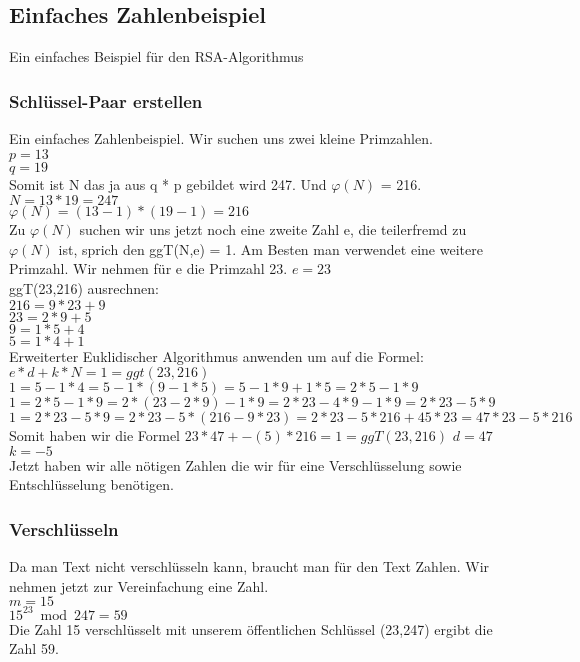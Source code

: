 \subsection{Einfaches Zahlenbeispiel}
Ein einfaches Beispiel für den RSA-Algorithmus
\subsubsection{Schlüssel-Paar erstellen}
Ein einfaches Zahlenbeispiel. Wir suchen uns zwei kleine Primzahlen.\\
$ p = 13 $ \\
$ q = 19 $ \\
Somit ist N das ja aus q * p gebildet wird 247. Und $ \varphi(N) $ = 216.\\
$ N = 13 * 19 = 247 $ \\
$ \varphi(N) = (13 - 1) * (19 - 1) = 216 $ \\
Zu $ \varphi(N) $ suchen wir uns jetzt noch eine zweite Zahl e, die teilerfremd zu $ \varphi(N) $ ist, sprich den ggT(N,e) = 1. Am Besten man verwendet eine weitere Primzahl. Wir nehmen für e die Primzahl 23.
$ e = 23 $\\
ggT(23,216) ausrechnen:\\
$ 216 = 9 * 23 + 9 $\\
$  23 = 2 *  9 + 5 $\\
$   9 = 1 *  5 + 4 $\\
$   5 = 1 *  4 + 1 $\\
Erweiterter Euklidischer Algorithmus anwenden um auf die Formel:
$e * d + k * N = 1 = ggt(23,216) $\\
$1 = 5 - 1 * 4 = 5 - 1 *(9 - 1 * 5) = 5 - 1*9 + 1 * 5 = 2*5 - 1*9$\\
$1 = 2*5 - 1*9 = 2 *(23 - 2 * 9) - 1*9 = 2*23 - 4*9 - 1*9 = 2*23 - 5*9$\\
$1 = 2*23 - 5*9=2*23 - 5 *(216 - 9 * 23) = 2*23 - 5*216 +45*23 = 47*23 - 5*216 $\\
Somit haben wir die Formel
$ 23 * 47 + -(5) * 216 = 1 = ggT(23,216) $
$ d = 47 $\\
$ k = -5 $\\
Jetzt haben wir alle nötigen Zahlen die wir für eine Verschlüsselung sowie Entschlüsselung benötigen.
\subsubsection{Verschlüsseln}
Da man Text nicht verschlüsseln kann, braucht man für den Text Zahlen. Wir nehmen jetzt zur Vereinfachung eine Zahl.\\
$ m = 15 $ \\
$ 15^{23} \bmod 247 = 59$ \\
Die Zahl 15 verschlüsselt mit unserem öffentlichen Schlüssel (23,247) ergibt die Zahl 59.

